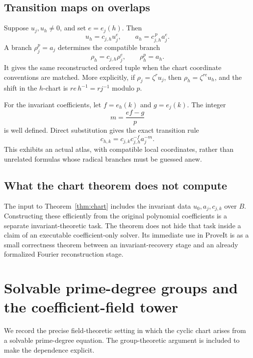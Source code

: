 \documentclass[11pt,a4paper]{article}
\theoremstyle{definition}
\theoremstyle{remark}
\begin{document}
\subsection{Transition maps on overlaps}

Suppose $u_j,u_h\neq0$, and set $e=e_j(h)$. Then
\[
 u_h=c_{j,h}u_j^e,\qquad
 a_h=c_{j,h}^{\,p}a_j^e.
\]
A branch $\rho_j^p=a_j$ determines the compatible branch
\begin{equation}
 \rho_h=c_{j,h}\rho_j^e,
 \qquad \rho_h^p=a_h.
 \label{eq:transition}
\end{equation}
It gives the same reconstructed ordered tuple when the chart coordinate
conventions are matched. More explicitly, if
$\rho_j=\zeta^r u_j$, then
$\rho_h=\zeta^{re}u_h$, and the shift in the $h$-chart is
$re\,h^{-1}=rj^{-1}$ modulo $p$.

For the invariant coefficients, let $f=e_h(k)$ and $g=e_j(k)$. The integer
\[
 m=\frac{ef-g}{p}
\]
is well defined. Direct substitution gives the exact transition rule
\begin{equation}
 c_{h,k}=c_{j,k}c_{j,h}^{-f}a_j^{-m}.
 \label{eq:transitioncoeff}
\end{equation}
This exhibits an actual atlas, with compatible local coordinates, rather
than unrelated formulas whose radical branches must be guessed anew.

\subsection{What the chart theorem does not compute}

The input to Theorem~\ref{thm:chart} includes the invariant data
$u_0,a_j,c_{j,k}$ over $B$. Constructing these efficiently from the original
polynomial coefficients is a separate invariant-theoretic task. The theorem
does not hide that task inside a claim of an executable coefficient-only
solver. Its immediate use in ProveIt is as a small correctness theorem
between an invariant-recovery stage and an already formalized Fourier
reconstruction stage.

\section{Solvable prime-degree groups and the coefficient-field tower}
\label{sec:groups}

We record the precise field-theoretic setting in which the cyclic chart
arises from a solvable prime-degree equation. The group-theoretic argument
is included to make the dependence explicit.
\end{document}
